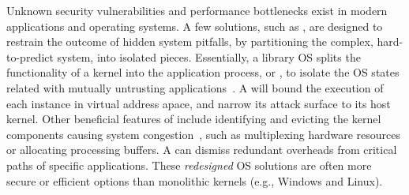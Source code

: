 Unknown security vulnerabilities and performance bottlenecks exist
in modern applications and operating systems.
A few solutions, such as \term{\liboses{}},
are designed to restrain
the outcome of hidden system pitfalls, %
by partitioning the complex, hard-to-predict system,
into isolated pieces.
Essentially, a library OS
splits the functionality of a kernel into
the application process,
or \term{\picoprocs{}},
to isolate the OS states related with mutually untrusting applications~\citep{porter11drawbridge, baumann13bascule, unikernels}.
A \picoproc{} will bound the execution of each \libos{} instance
in virtual address apace,
and narrow its attack surface to its host kernel.
Other beneficial features of \liboses{}
include
identifying and evicting the kernel components causing system congestion~\citep{engler95exokernel, leslie96nemesis, unikernels},
such as multiplexing hardware resources or allocating processing buffers.
A \libos{} can
dismiss %
redundant overheads
from critical paths of specific applications.
These \emph{redesigned} OS solutions are often more secure or efficient options
than monolithic kernels
(e.g., Windows and Linux).





